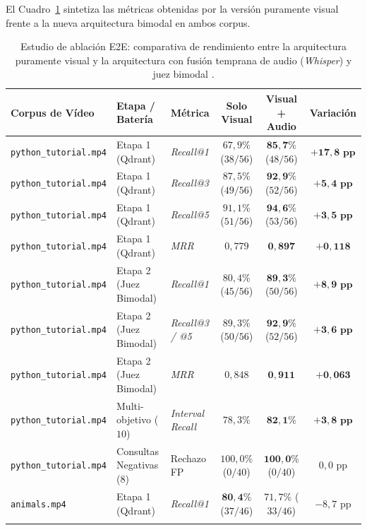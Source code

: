 El Cuadro~\ref{tab:ablacion_e2e_visual_vs_audio} sintetiza las métricas obtenidas por la versión puramente visual frente a la nueva arquitectura bimodal en ambos corpus. %

\begin{table}[htbp]
\centering
\small
\setlength{\tabcolsep}{4.5pt}
\caption{Estudio de ablación E2E: comparativa de rendimiento entre la arquitectura puramente visual y la arquitectura con fusión temprana de audio (\textit{Whisper}) y juez bimodal \cite{gemini_emb2_docs, video_rac2025}.} %
\label{tab:ablacion_e2e_visual_vs_audio}
\begin{tabular}{lllccc}
\toprule
\textbf{Corpus de Vídeo} & \textbf{Etapa / Batería} & \textbf{Métrica} & \textbf{Solo Visual} & \textbf{Visual + Audio} & \textbf{Variación} \\
\midrule
\texttt{python\_tutorial.mp4} & Etapa 1 (Qdrant) & \textit{Recall@1} & $67,9\%$ ($38/56$) & $\mathbf{85,7\%}$ ($48/56$) & $\mathbf{+17,8\text{ pp}}$ \\
\texttt{python\_tutorial.mp4} & Etapa 1 (Qdrant) & \textit{Recall@3} & $87,5\%$ ($49/56$) & $\mathbf{92,9\%}$ ($52/56$) & $\mathbf{+5,4\text{ pp}}$ \\
\texttt{python\_tutorial.mp4} & Etapa 1 (Qdrant) & \textit{Recall@5} & $91,1\%$ ($51/56$) & $\mathbf{94,6\%}$ ($53/56$) & $\mathbf{+3,5\text{ pp}}$ \\
\texttt{python\_tutorial.mp4} & Etapa 1 (Qdrant) & \textit{MRR} & $0,779$ & $\mathbf{0,897}$ & $\mathbf{+0,118}$ \\ \addlinespace[2.5pt]
\texttt{python\_tutorial.mp4} & Etapa 2 (Juez Bimodal) & \textit{Recall@1} & $80,4\%$ ($45/56$) & $\mathbf{89,3\%}$ ($50/56$) & $\mathbf{+8,9\text{ pp}}$ \\
\texttt{python\_tutorial.mp4} & Etapa 2 (Juez Bimodal) & \textit{Recall@3 / @5} & $89,3\%$ ($50/56$) & $\mathbf{92,9\%}$ ($52/56$) & $\mathbf{+3,6\text{ pp}}$ \\
\texttt{python\_tutorial.mp4} & Etapa 2 (Juez Bimodal) & \textit{MRR} & $0,848$ & $\mathbf{0,911}$ & $\mathbf{+0,063}$ \\ \addlinespace[2.5pt]
\texttt{python\_tutorial.mp4} & Multi-objetivo ($10$) & \textit{Interval Recall} & $78,3\%$ & $\mathbf{82,1\%}$ & $\mathbf{+3,8\text{ pp}}$ \\
\texttt{python\_tutorial.mp4} & Consultas Negativas ($8$) & Rechazo FP & $100,0\%$ ($0/40$) & $\mathbf{100,0\%}$ ($0/40$) & $0,0\text{ pp}$ \\
\midrule
\texttt{animals.mp4} & Etapa 1 (Qdrant) & \textit{Recall@1} & $\mathbf{80,4\%}$ ($37/46$) & $71,7\%$ ($33/46$) & $-8,7\text{ pp}$ \\ \addlinespace[2.5pt]

\end{tabular}
\end{table}
